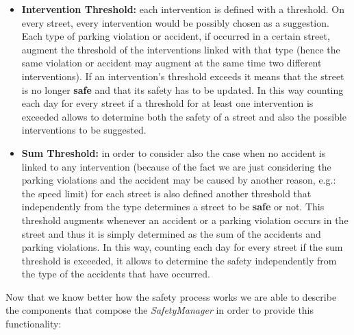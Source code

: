 			\begin{itemize}
				\item \textbf{Intervention Threshold:} each intervention is defined with a threshold. On every street, every intervention would be possibly chosen as a suggestion. Each type of parking violation or accident, if occurred in a certain street, augment the threshold of the interventions linked with that type (hence the same violation or accident may augment at the same time two different interventions). If an intervention's threshold exceeds it means that the street is no longer \textbf{safe} and that its safety has to be updated. In this way counting each day for every street if a threshold for at least one intervention is exceeded allows to determine both the safety of a street and also the possible interventions to be suggested.
				
				\item \textbf{Sum Threshold:} in order to consider also the case when no accident is linked to any intervention (because of the fact we are just considering the parking violations and the accident may be caused by another reason, e.g.: the speed limit) for each street is also defined another threshold that independently from the type determines a street to be \textbf{safe} or not. This threshold augments whenever an accident or a parking violation occurs in the street and thus it is simply determined as the sum of the accidents and parking violations. In this way, counting each day for every street if the sum threshold is exceeded, it allows to determine the safety independently from the type of the accidents that have occurred.
			\end{itemize}
		
			Now that we know better how the safety process works we are able to describe the components that compose the \emph{SafetyManager} in order to provide this functionality:
			
